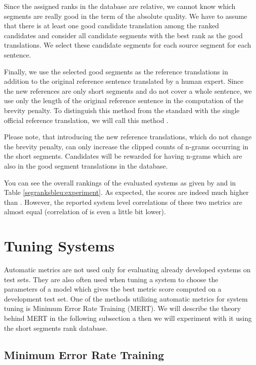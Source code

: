 Since the assigned ranks in the database are relative, we cannot know which
segments are really good in the term of the absolute quality. We have to assume
that there is at least one good candidate translation among the ranked
candidates and consider all candidate segments with the best rank as the good
translations. We select these candidate segments for each source segment for
each sentence.

Finally, we use the selected good segments as the reference translations in
addition to the original reference sentence translated by a human expert.  Since
the new references are only short segments and do not cover a whole sentence,
we use only the length of the original reference sentence in the computation of
the brevity penalty. To distinguish this method from the standard 
with the single official reference translation, we will call this method
.

Please note, that introducing the new reference
translations, which do not change the brevity penalty, can only increase the
clipped counts of n-grams occurring in the short segments.  Candidates will be
rewarded for having n-grams which are also in the good segment translations in
the database.

You can see the overall rankings of the evaluated systems as given by
 and  in Table
\ref{segranksbleu:experiment}. As expected, the  scores
are indeed much higher than . However, the reported system level
correlations of these two metrics are almost equal (correlation of
 is even a little bit lower).


\section{Tuning Systems}
\label{tuning-systems}

Automatic metrics are not used only for evaluating already developed systems on
test sets. They are also often used when tuning a system to choose the
parameters of a model which gives the best metric score computed on a
development test set. One of the methods utilizing automatic metrics for system
tuning is Minimum Error Rate Training (MERT). We will describe the theory
behind MERT in the following subsection a then we will experiment with it using
the short segments rank database.

\subsection{Minimum Error Rate Training}

